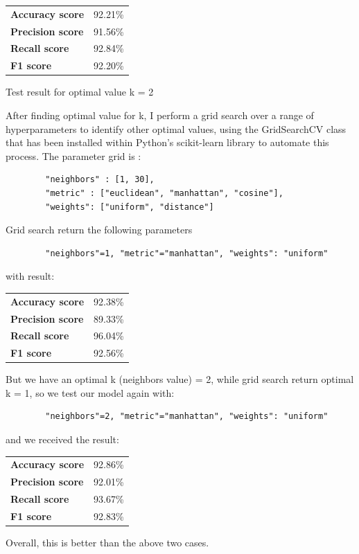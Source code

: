 \documentclass[a4paper]{report}
\begin{document}
	\begin{center}
		\begin{tabular}{ll}
			\toprule
			\textbf{Accuracy score} & 92.21\% \\
			\textbf{Precision score} & 91.56\%\\
			\textbf{Recall score} & 92.84\% \\
			\textbf{F1 score } & 92.20\%\\
			\bottomrule
		\end{tabular}
		
		\label{tab:example}
	\end{center}
	\begin{center}
		Test result for optimal value k = 2
	\end{center}
	After finding optimal value for k, I perform a grid search over a range of hyperparameters to identify other optimal values, using the GridSearchCV class that has been installed within Python's scikit-learn library to automate this process. The parameter grid is : 
	\begin{verbatim}
		"neighbors" : [1, 30], 
		"metric" : ["euclidean", "manhattan", "cosine"], 
		"weights": ["uniform", "distance"]
	\end{verbatim}
	Grid search return the following parameters
	\begin{verbatim}
		"neighbors"=1, "metric"="manhattan", "weights": "uniform"
	\end{verbatim}
	with result:
	\begin{center}
		\begin{tabular}{ll}
			\toprule
			\textbf{Accuracy score} & 92.38\% \\
			\textbf{Precision score} & 89.33\%\\
			\textbf{Recall score} & 96.04\% \\
			\textbf{F1 score } & 92.56\%\\
			\bottomrule
		\end{tabular}
	\end{center}
	But we have an optimal k (neighbors value) = 2, while grid search return optimal k = 1, so we test our model again with:
	\begin{verbatim}
		"neighbors"=2, "metric"="manhattan", "weights": "uniform"
	\end{verbatim}
	and we received the result:
	\begin{center}
		\begin{tabular}{ll}
			\toprule
			\textbf{Accuracy score} & 92.86\% \\
			\textbf{Precision score} & 92.01\%\\
			\textbf{Recall score} & 93.67\% \\
			\textbf{F1 score } & 92.83\%\\
			\bottomrule
		\end{tabular}
	\end{center}
	Overall, this is better than the above two cases.
	
\end{document}
